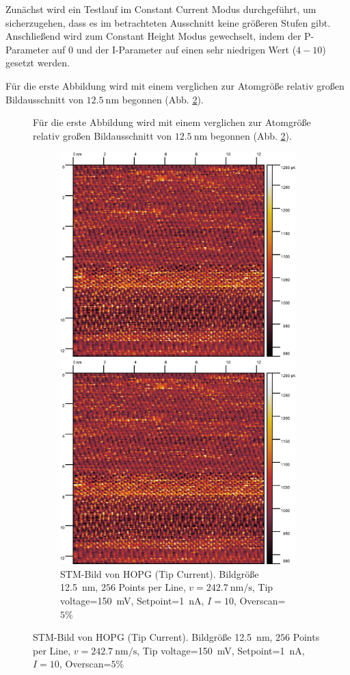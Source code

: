 \documentclass{article}
\begin{document}
Zunächst wird ein Testlauf im Constant Current Modus durchgeführt, um sicherzugehen, dass
es im betrachteten Ausschnitt keine größeren Stufen gibt.
Anschließend wird zum Constant Height Modus gewechselt, indem der P-Parameter auf $0$ und der
I-Parameter auf einen sehr niedrigen Wert ($4 - 10$) gesetzt werden.

Für die erste Abbildung wird mit einem verglichen zur Atomgröße relativ großen Bildausschnitt von $\SI{12.5}{\nm}$ begonnen (Abb. \ref{fig:hopg-large}). 
\begin{figure}[h]
Für die erste Abbildung wird mit einem verglichen zur Atomgröße relativ großen Bildausschnitt von $\SI{12.5}{\nm}$ begonnen (Abb. \ref{fig:hopg-large}). 
\begin{figure}[h]
    \centering
    \includegraphics[width=0.5\linewidth]{figure/hopg-large.jpg}
    \caption{STM-Bild von HOPG (Tip Current). Bildgröße \SI{12.5}{\nm}, $256$ Points per Line,
    $v=\SI{242.7}{\nm\per\s}$, Tip voltage=\SI{150}{\mV}, Setpoint=\SI{1}{\nA}, $I=10$, Overscan=$5\%$}
    \includegraphics[width=0.5\linewidth]{figure/hopg-large.jpg}
    \caption{STM-Bild von HOPG (Tip Current). Bildgröße \SI{12.5}{\nm}, $256$ Points per Line,
    $v=\SI{242.7}{\nm\per\s}$, Tip voltage=\SI{150}{\mV}, Setpoint=\SI{1}{\nA}, $I=10$, Overscan=$5\%$}
    \label{fig:hopg-large}
\end{figure}


\end{figure}
\end{document}
